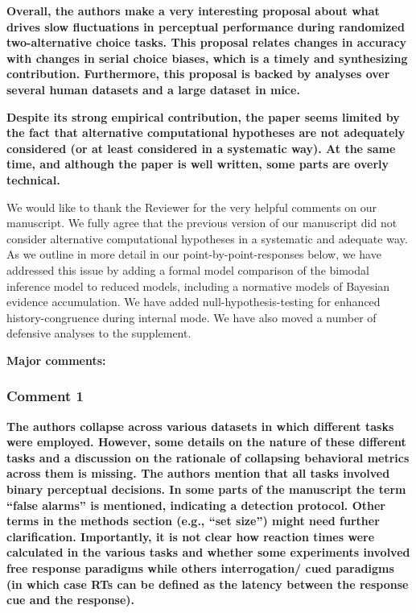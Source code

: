 \documentclass[
]{article}
\begin{document}
\textbf{Overall, the authors make a very interesting proposal about what
drives slow fluctuations in perceptual performance during randomized
two-alternative choice tasks. This proposal relates changes in accuracy
with changes in serial choice biases, which is a timely and synthesizing
contribution. Furthermore, this proposal is backed by analyses over
several human datasets and a large dataset in mice.}

\textbf{Despite its strong empirical contribution, the paper seems
limited by the fact that alternative computational hypotheses are not
adequately considered (or at least considered in a systematic way). At
the same time, and although the paper is well written, some parts are
overly technical.}

We would like to thank the Reviewer for the very helpful comments on our
manuscript. We fully agree that the previous version of our manuscript
did not consider alternative computational hypotheses in a systematic
and adequate way. As we outline in more detail in our
point-by-point-responses below, we have addressed this issue by adding a
formal model comparison of the bimodal inference model to reduced
models, including a normative models of Bayesian evidence accumulation.
We have added null-hypothesis-testing for enhanced history-congruence
during internal mode. We have also moved a number of defensive analyses
to the supplement.

\textbf{Major comments:}

\hypertarget{comment-1-2}{%
\subsubsection{Comment 1}\label{comment-1-2}}

\textbf{The authors collapse across various datasets in which different
tasks were employed. However, some details on the nature of these
different tasks and a discussion on the rationale of collapsing
behavioral metrics across them is missing. The authors mention that all
tasks involved binary perceptual decisions. In some parts of the
manuscript the term ``false alarms'' is mentioned, indicating a
detection protocol. Other terms in the methods section (e.g., ``set
size'') might need further clarification. Importantly, it is not clear
how reaction times were calculated in the various tasks and whether some
experiments involved free response paradigms while others interrogation/
cued paradigms (in which case RTs can be defined as the latency between
the response cue and the response).}
\end{document}
